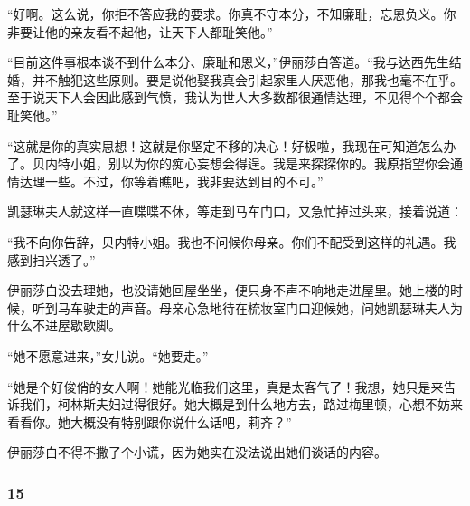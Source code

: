 \par “好啊。这么说，你拒不答应我的要求。你真不守本分，不知廉耻，忘恩负义。你非要让他的亲友看不起他，让天下人都耻笑他。”
\par “目前这件事根本谈不到什么本分、廉耻和恩义，”伊丽莎白答道。“我与达西先生结婚，并不触犯这些原则。要是说他娶我真会引起家里人厌恶他，那我也毫不在乎。至于说天下人会因此感到气愤，我认为世人大多数都很通情达理，不见得个个都会耻笑他。”
\par “这就是你的真实思想！这就是你坚定不移的决心！好极啦，我现在可知道怎么办了。贝内特小姐，别以为你的痴心妄想会得逞。我是来探探你的。我原指望你会通情达理一些。不过，你等着瞧吧，我非要达到目的不可。”
\par 凯瑟琳夫人就这样一直喋喋不休，等走到马车门口，又急忙掉过头来，接着说道：
\par “我不向你告辞，贝内特小姐。我也不问候你母亲。你们不配受到这样的礼遇。我感到扫兴透了。”
\par 伊丽莎白没去理她，也没请她回屋坐坐，便只身不声不响地走进屋里。她上楼的时候，听到马车驶走的声音。母亲心急地待在梳妆室门口迎候她，问她凯瑟琳夫人为什么不进屋歇歇脚。
\par “她不愿意进来，”女儿说。“她要走。”
\par “她是个好俊俏的女人啊！她能光临我们这里，真是太客气了！我想，她只是来告诉我们，柯林斯夫妇过得很好。她大概是到什么地方去，路过梅里顿，心想不妨来看看你。她大概没有特别跟你说什么话吧，莉齐？”
\par 伊丽莎白不得不撒了个小谎，因为她实在没法说出她们谈话的内容。



\subsubsection*{15}

